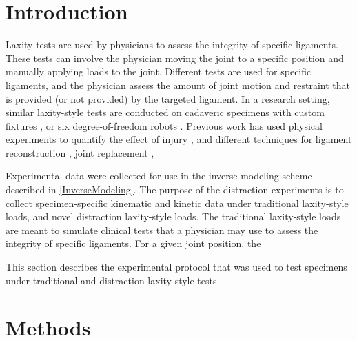 \label{DistractionExperiment}
\section{Introduction}
Laxity tests are used by physicians to assess the integrity of specific ligaments. These tests can involve the physician moving the joint to a specific position and manually applying loads to the joint. Different tests are used for specific ligaments, and the physician assess the amount of joint motion and restraint that is provided (or not provided) by the targeted ligament. In a research setting, similar laxity-style tests are conducted on cadaveric specimens with custom fixtures \citep{roth_joshua_d._limits_2015,walker_effect_2014,rachmat_-situ_2016}, or six degree-of-freedom robots . Previous work has used physical experiments to quantify the effect of injury , and different techniques for ligament reconstruction , joint replacement ,

Experimental data were collected for use in the inverse modeling scheme described in \autoref{InverseModeling}. The purpose of the distraction experiments is to collect specimen-specific kinematic and kinetic data under traditional laxity-style loads, and novel distraction laxity-style loads. The traditional laxity-style loads are meant to simulate clinical tests that a physician may use to assess the integrity of specific ligaments. For a given joint position, the 

This section describes the experimental protocol that was used to test specimens under traditional and distraction laxity-style tests.

\section{Methods}
